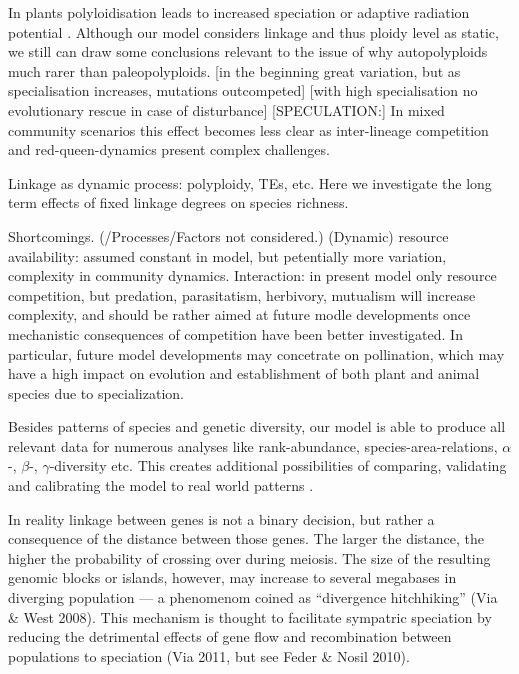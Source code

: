 \documentclass[a4paper]{scrartcl}
\begin{document}
In plants polyloidisation leads to increased speciation or adaptive radiation potential \cite{baduelPolyploidHopShifting2018}.
Although our model considers linkage and thus ploidy level as static, we still can draw some conclusions relevant to the issue
of why autopolyploids much rarer than paleopolyploids.
[in the beginning great variation, but as specialisation increases, mutations outcompeted]
[with high specialisation no evolutionary rescue in case of disturbance]
[SPECULATION:] In mixed community scenarios this effect becomes less clear as inter-lineage competition and red-queen-dynamics
present complex challenges.



Linkage as dynamic process: polyploidy, TEs, etc.
Here we investigate the long term effects of fixed linkage degrees on species richness.


Shortcomings. (/Processes/Factors not considered.)
(Dynamic) resource availability: assumed constant in model, but petentially more variation, complexity in community dynamics.
Interaction: in present model only resource competition, %
but predation, parasitatism, herbivory, mutualism will increase complexity,
and should be rather aimed at future modle developments once mechanistic consequences of competition have been better investigated.
In particular, future model developments may concetrate on pollination,
which may have a high impact on evolution and establishment of both plant and animal species due to specialization. %

Besides patterns of species and genetic diversity, our model is able to produce all relevant data for
numerous analyses like rank-abundance, species-area-relations, $\alpha$-, $\beta$-, $\gamma$-diversity etc.
This creates additional possibilities of comparing, validating and calibrating the model to real world patterns \cite{SimpleModelsLead2013}. %

In reality linkage between genes is not a binary decision, but rather a consequence of the distance between those genes.
The larger the distance, the higher the probability of crossing over during meiosis.
The size of the resulting genomic blocks or islands, however, may increase to several megabases in diverging population ---
a phenomenom coined as ``divergence hitchhiking'' (Via \& West 2008). %
This mechanism is thought to facilitate sympatric speciation by reducing the detrimental effects of gene flow and
recombination between populations to speciation (Via 2011, but see Feder \& Nosil 2010).
\end{document}
